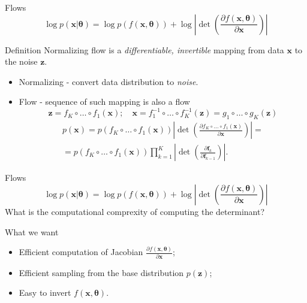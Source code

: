 \documentclass{beamer}
\newcommand{\bx}{\mathbf{x}}
\newcommand{\bz}{\mathbf{z}}
\newcommand{\btheta}{\boldsymbol{\theta}}
\begin{document}
\begin{frame}{Flows}
	\[
	\log p(\bx|\btheta) = \log p(f(\bx, \btheta)) + \log \left|\det \left( \frac{\partial f(\bx, \btheta)}{\partial \bx} \right) \right|
	\]
	\begin{block}{Definition}
		Normalizing flow is a \textit{differentiable, invertible} mapping from data $\bx$ to the noise $\bz$. 
	\end{block}
	\begin{itemize}
		\item Normalizing - convert data distribution to \textit{noise}.
		\item Flow - sequence of such mapping is also a flow
		\[
		\bz = f_K \circ \dots \circ f_1(\bx); \quad \bx = f_1^{-1} \circ \dots \circ f_K^{-1} (\bz) = g_1 \circ \dots \circ g_K(\bz) 
		\] 
		\begin{multline*}
			p(\bx) = p(f_K \circ \dots \circ f_1(\bx)) \left|\det \left(\frac{\partial f_K \circ \dots \circ f_1(\bx)}{\partial \bx} \right) \right| = \\
			= p(f_K \circ \dots \circ f_1(\bx)) \prod_{k=1}^K \left|\det \left(\frac{\partial \mathbf{f}_k}{\partial \mathbf{f}_{k-1}} \right) \right|.
		\end{multline*}
	\end{itemize}
\end{frame}
\begin{frame}{Flows}
	\[
	\log p(\bx|\btheta) = \log p(f(\bx, \btheta)) + \log \left|\det \left( \frac{\partial f(\bx, \btheta)}{\partial \bx} \right) \right|
	\]
	What is the computational comprexity of computing the determinant?
	\begin{block}{What we want}
		\begin{itemize}
			\item Efficient computation of Jacobian $\frac{\partial f(\bx, \btheta)}{\partial \bx}$;
			\item Efficient sampling from the base distribution $p(\bz)$;
			\item Easy to invert $f(\bx, \btheta)$.
		\end{itemize}
		
	\end{block}
	
\end{frame}
\end{document}
